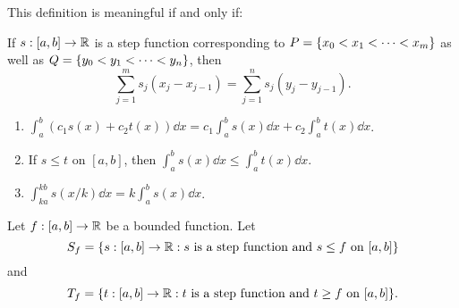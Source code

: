 \begin{rem}
    This definition is meaningful if and only if:

    If $s : [a, b] \to \mathbb{R}$ is a step function corresponding to $P = \set{x_{0} < x_{1} < \dots < x_{m}}$ as well as $Q = \set{y_{0} < y_{1} < \dots < y_{n}}$, then \[
        \sum_{j = 1}^{m} s_{j} (x_{j} - x_{j - 1}) = \sum_{j = 1}^{n} s_{j} (y_{j} - y_{j - 1}).
    \]
\end{rem}

\begin{thm}[Properties] \label{thm:integration:properties} \leavevmode
    \begin{enumerate}[label=(\alph*)]
        \item $\int_{a}^{b} (c_{1}s(x) + c_{2}t(x)) \dd x = c_{1} \int_{a}^{b} s(x) \dd x + c_{2} \int_{a}^{b} t(x) \dd x$.
        \item If $s \leq t$ on $[a, b]$, then $\int_{a}^{b} s(x) \dd x \leq \int_{a}^{b} t(x) \dd x$.
        \item $\int_{ka}^{kb} s(x/k) \dd x = k \int_{a}^{b} s(x) \dd x$.
    \end{enumerate}
\end{thm}

\begin{defn}[]
    Let $f : [a, b] \to \mathbb{R}$ be a bounded function. Let \[
        S_{f} = \set{s : [a, b] \to \R : s \text{ is a step function and } s \leq f \text{ on } [a, b]}
    \] and \[
        T_{f} = \set{t : [a, b] \to \R : t \text{ is a step function and } t \geq f \text{ on } [a, b]}.
    \]
\end{defn}

